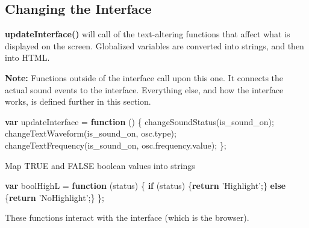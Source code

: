 \documentclass[]{article}
\newenvironment{Shaded}{}{}
\newcommand{\KeywordTok}[1]{\textbf{#1}}
\newcommand{\StringTok}[1]{#1}
\newcommand{\VariableTok}[1]{#1}
\newcommand{\ControlFlowTok}[1]{\textbf{#1}}
\newcommand{\OperatorTok}[1]{#1}
\newcommand{\AttributeTok}[1]{#1}
\newcommand{\NormalTok}[1]{#1}
\begin{document}
\subsection{Changing the Interface}\label{changing-the-interface}

\textbf{updateInterface()} will call of the text-altering functions that
affect what is displayed on the screen. Globalized variables are
converted into strings, and then into HTML.

\textbf{Note:} Functions outside of the interface call upon this one. It
connects the actual sound events to the interface. Everything else, and
how the interface works, is defined further in this section.

\begin{Shaded}
\begin{Highlighting}[]
\KeywordTok{var}\NormalTok{ updateInterface }\OperatorTok{=} \KeywordTok{function}\NormalTok{ () }\OperatorTok{\{}
    \AttributeTok{changeSoundStatus}\NormalTok{(is_sound_on)}\OperatorTok{;}
    \AttributeTok{changeTextWaveform}\NormalTok{(is_sound_on}\OperatorTok{,} \VariableTok{osc}\NormalTok{.}\AttributeTok{type}\NormalTok{)}\OperatorTok{;}
    \AttributeTok{changeTextFrequency}\NormalTok{(is_sound_on}\OperatorTok{,} \VariableTok{osc}\NormalTok{.}\VariableTok{frequency}\NormalTok{.}\AttributeTok{value}\NormalTok{)}\OperatorTok{;}
\OperatorTok{\};}
\end{Highlighting}
\end{Shaded}

Map TRUE and FALSE boolean values into strings

\begin{Shaded}
\begin{Highlighting}[]
\KeywordTok{var}\NormalTok{ boolHighL }\OperatorTok{=} \KeywordTok{function}\NormalTok{ (status) }\OperatorTok{\{}
    \ControlFlowTok{if}\NormalTok{ (status) }\OperatorTok{\{}\ControlFlowTok{return} \StringTok{'Highlight'}\OperatorTok{;\}} 
    \ControlFlowTok{else}        \OperatorTok{\{}\ControlFlowTok{return} \StringTok{'NoHighlight'}\OperatorTok{;\}}
\OperatorTok{\};}
\end{Highlighting}
\end{Shaded}

These functions interact with the interface (which is the browser).
\end{document}
